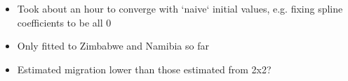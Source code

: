 \documentclass[12pt,a4paper]{article}
\begin{document}
\begin{itemize}
\item Took about an hour to converge with `naive` initial values, e.g. fixing spline coefficients to be all 0
\item Only fitted to Zimbabwe and Namibia so far
\item Estimated migration lower than those estimated from 2x2?
\end{itemize}


\end{document}
